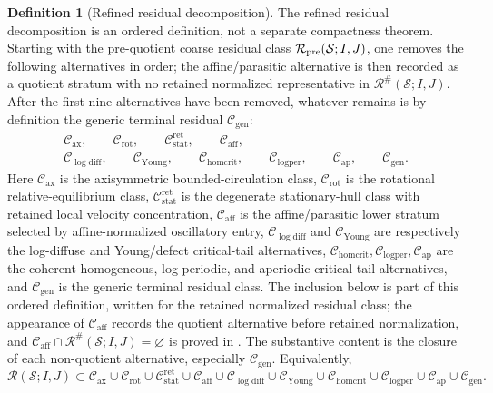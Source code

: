 \documentclass[11pt]{amsart}
\numberwithin{equation}{section}
\theoremstyle{plain}
\theoremstyle{definition}
\newtheorem{definition}[definition]{Definition}
\theoremstyle{remark}
\newcommand{\calS}{\mathcal S}
\newcommand{\calR}{\mathcal R}
\newcommand{\Cax}{\mathcal C_{\mathrm{ax}}}
\newcommand{\Crot}{\mathcal C_{\mathrm{rot}}}
\newcommand{\Cstat}{\mathcal C_{\mathrm{stat}}^{\mathrm{ret}}}
\newcommand{\Caff}{\mathcal C_{\mathrm{aff}}}
\newcommand{\Cgen}{\mathcal C_{\mathrm{gen}}}
\newcommand{\Chomcrit}{\mathcal C_{\mathrm{homcrit}}}
\newcommand{\Clogper}{\mathcal C_{\mathrm{logper}}}
\newcommand{\Capcrit}{\mathcal C_{\mathrm{ap}}}
\newcommand{\Cyoung}{\mathcal C_{\mathrm{Young}}}
\newcommand{\Clogdiff}{\mathcal C_{\log\mathrm{diff}}}
\begin{document}
\begin{definition}[Refined residual decomposition]
\label{def:refined-decomposition}
The refined residual decomposition is an ordered definition, not a separate
compactness theorem.  Starting with the pre-quotient coarse residual class
\(\calR_{\rm pre}(\calS;I,J)\), one removes the following alternatives in
order; the affine/parasitic alternative is then recorded as a quotient stratum
with no retained normalized representative in \(\calR^\#(\calS;I,J)\).  After
the first nine alternatives have been removed, whatever remains is by definition
the generic terminal residual \(\Cgen\):
\[
\begin{gathered}
   \Cax,\qquad \Crot,\qquad \Cstat,\qquad \Caff,\\
   \Clogdiff,\qquad \Cyoung,\qquad
   \Chomcrit,\qquad \Clogper,\qquad \Capcrit,\qquad \Cgen .
\end{gathered}
\]
Here \(\Cax\) is the axisymmetric bounded-circulation class, \(\Crot\) is the
rotational relative-equilibrium class, \(\Cstat\) is the degenerate
stationary-hull class with retained local velocity concentration, \(\Caff\) is the
affine/parasitic lower stratum selected by affine-normalized oscillatory entry,
\(\Clogdiff\) and \(\Cyoung\) are respectively the log-diffuse and Young/defect
critical-tail alternatives, \(\Chomcrit,\Clogper,\Capcrit\) are the coherent
homogeneous, log-periodic, and aperiodic critical-tail alternatives, and \(\Cgen\)
is the generic terminal residual class.  The inclusion below is part of this
ordered definition, written for the retained normalized residual class; the
appearance of \(\Caff\) records the quotient alternative before retained
normalization, and \(\Caff\cap\calR^\#(\calS;I,J)=\varnothing\) is proved in
.  The substantive content is the
closure of each non-quotient alternative, especially \(\Cgen\).  Equivalently,
\begin{equation}\label{eq:complete-residual-decomposition}
   \calR(\calS;I,J)
   \subset
   \Cax\cup\Crot\cup\Cstat\cup\Caff
   \cup\Clogdiff\cup\Cyoung\cup\Chomcrit\cup\Clogper\cup\Capcrit
   \cup\Cgen .
\end{equation}
\end{definition}
\end{document}
